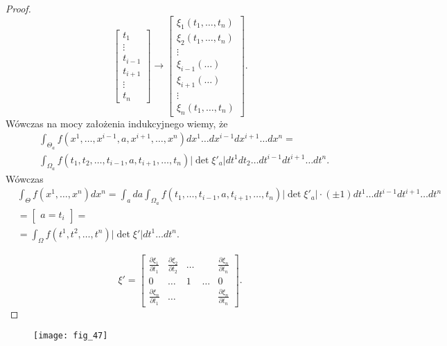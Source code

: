 \documentclass[../main.tex]{subfiles}
\begin{document}
\begin{proof}
     \[
         \begin{bmatrix} t_1\\ \vdots\\ t_{i-1}\\ t_{i+1} \\ \vdots \\ t_n \end{bmatrix} \to \begin{bmatrix} \xi_1(t_1,\ldots,t_n) \\ \xi_2(t_1,\ldots,t_n) \\ \vdots \\ \xi_{i-1}(\ldots) \\ \xi_{i+1}(\ldots) \\ \vdots \\ \xi_n(t_1,\ldots,t_n)\end{bmatrix}
    .\]
    Wówczas na mocy założenia indukcyjnego wiemy, że
    \begin{align*}
        &\int_{\Theta_a}f(x^1,\ldots,x^{i-1},a,x^{i+1},\ldots,x^n) dx^1 \ldots dx^{i-1} dx^{i+1} \ldots dx^n = \\
        &\int_{\Omega_a} f(t_1,t_2,\ldots,t_{i-1},a,t_{i+1},\ldots,t_n) |\det \xi'_a | dt^1 dt_2 \ldots dt^{i-1} dt^{i+1} \ldots dt^n
    .\end{align*}
    Wówczas
    \begin{align*}
        &\int_{\Theta}f(x^1,\ldots,x^n)dx^n = \int_a da \int_{\Omega_a}f(t_1,\ldots,t_{i-1},a,t_{i+1},\ldots,t_n) |\det \xi'_a| \cdot (\pm 1) dt^1 \ldots dt^{i-1} dt^{i+1} \ldots dt^n\\
        &= \begin{bmatrix} a=t_i \end{bmatrix} =\\
        &= \int_{\Omega} f(t^1,t^2,\ldots,t^n)|\det \xi' | dt^1 \ldots dt^n
.\end{align*}

\[
    \xi' = \begin{bmatrix} \frac{\partial \xi_1}{\partial t_1} & \frac{\partial \xi_2}{\partial t_2} & \ldots && \frac{\partial \xi_n}{\partial t_n}\\ 0 & \ldots & 1 & \ldots & 0 \\ \frac{\partial \xi_n}{\partial t_1} & \ldots &&& \frac{\partial \xi_n}{\partial t_n}  \end{bmatrix}
.\]

    \end{proof}
    \begin{figure}[h]
        \centering
        \texttt{[image: fig\_47]}
    \end{figure}
\end{document}
